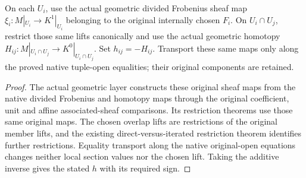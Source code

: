 \begin{definition}
\label{def:di-actual-witt-cech-components}
\leanok
{}
On each $U_i$, use the actual geometric divided Frobenius sheaf map
$\xi_i:M|_{U_i}\to K^1|_{U_i}$ belonging to the original internally
chosen $F_i$. On $U_i\cap U_j$, restrict those same lifts canonically and
use the actual geometric homotopy $H_{ij}:M|_{U_i\cap U_j}\to K^0|_{U_i\cap U_j}$.
Set $h_{ij}=-H_{ij}$. Transport these same maps only along the proved
native tuple-open equalities; their original components are retained.
\end{definition}
\begin{proof}
The actual geometric layer constructs these original sheaf maps from the
native divided Frobenius and homotopy maps through the original coefficient,
unit and affine associated-sheaf comparisons. Its restriction theorems use
those same original maps. The chosen overlap lifts are restrictions of
the original member lifts, and the existing direct-versus-iterated
restriction theorem identifies further restrictions. Equality transport
along the native original-open equations changes neither local section
values nor the chosen lift. Taking the additive inverse gives the stated
$h$ with its required sign.
\end{proof}

